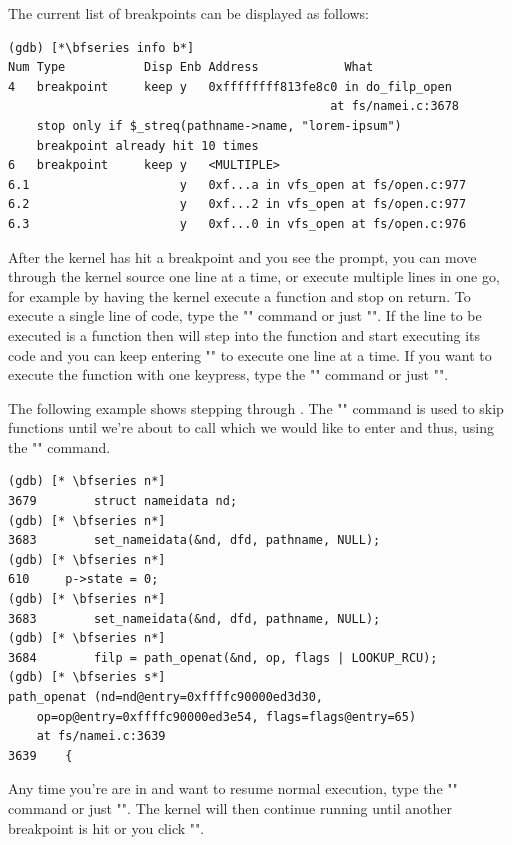 \noindent
The current list of breakpoints can be displayed as follows:

\begin{lstlisting}
(gdb) [*\bfseries info b*]
Num Type           Disp Enb Address            What
4   breakpoint     keep y   0xffffffff813fe8c0 in do_filp_open 
                                             at fs/namei.c:3678
    stop only if $_streq(pathname->name, "lorem-ipsum")
    breakpoint already hit 10 times
6   breakpoint     keep y   <MULTIPLE>         
6.1                     y   0xf...a in vfs_open at fs/open.c:977
6.2                     y   0xf...2 in vfs_open at fs/open.c:977
6.3                     y   0xf...0 in vfs_open at fs/open.c:976
\end{lstlisting}

\noindent
After the kernel has hit a breakpoint and you see the  prompt, you can move through the kernel source one line at a time, or execute multiple lines in one go, for example by having the kernel execute a function and stop on return. To execute a single line of code, type the "" command or just "". If the line to be executed is a function then  will step into the function and start executing its code and you can keep entering "" to execute one line at a time. If you want to execute the function with one keypress, type the "" command or just "". 

The following example shows stepping through . The "" command is used to skip functions until we're about to call  which we would like to enter and thus, using the "" command.

\begin{lstlisting}
(gdb) [* \bfseries n*]
3679		struct nameidata nd;
(gdb) [* \bfseries n*]
3683		set_nameidata(&nd, dfd, pathname, NULL);
(gdb) [* \bfseries n*]
610		p->state = 0;
(gdb) [* \bfseries n*]
3683		set_nameidata(&nd, dfd, pathname, NULL);
(gdb) [* \bfseries n*]
3684		filp = path_openat(&nd, op, flags | LOOKUP_RCU);
(gdb) [* \bfseries s*]
path_openat (nd=nd@entry=0xffffc90000ed3d30, 
    op=op@entry=0xffffc90000ed3e54, flags=flags@entry=65) 
    at fs/namei.c:3639
3639	{
\end{lstlisting}

\noindent
Any time you're are in  and want to resume normal execution, type the "" command or just "". The kernel will then continue running until another breakpoint is hit or you click "". 

